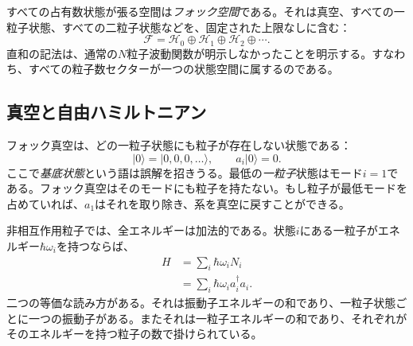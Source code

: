 すべての占有数状態が張る空間は\emph{フォック空間}である。それは真空、すべての一粒子状態、すべての二粒子状態などを、固定された上限なしに含む：
\begin{equation}
\mathcal F=\mathcal H_0\oplus\mathcal H_1\oplus\mathcal H_2\oplus\cdots.
\label{eq:l06-fock-space}
\end{equation}
直和の記法は、通常の\(N\)粒子波動関数が明示しなかったことを明示する。すなわち、すべての粒子数セクターが一つの状態空間に属するのである。

\begin{classroomqa}
\end{classroomqa}

\subsection{真空と自由ハミルトニアン}

フォック真空は、どの一粒子状態にも粒子が存在しない状態である：
\begin{equation}
|0\rangle=|0,0,0,\ldots\rangle,
\qquad a_i|0\rangle=0.
\end{equation}
ここで\emph{基底状態}という語は誤解を招きうる。最低の\emph{一粒子}状態はモード\(i=1\)である。フォック真空はそのモードにも粒子を持たない。もし粒子が最低モードを占めていれば、\(a_1\)はそれを取り除き、系を真空に戻すことができる。

\begin{classroomqa}
\end{classroomqa}

非相互作用粒子では、全エネルギーは加法的である。状態\(i\)にある一粒子がエネルギー\(\hbar\omega_i\)を持つならば、
\begin{align}
H
&=\sum_i \hbar\omega_i N_i \\
&=\sum_i \hbar\omega_i a_i^\dagger a_i.
\label{eq:l06-free-fock-hamiltonian}
\end{align}
二つの等価な読み方がある。それは振動子エネルギーの和であり、一粒子状態ごとに一つの振動子がある。またそれは一粒子エネルギーの和であり、それぞれがそのエネルギーを持つ粒子の数で掛けられている。

